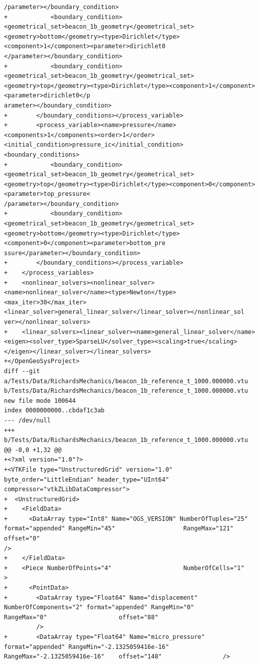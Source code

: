 \documentclass[10pt]{article}
\begin{document}
\begin{lstlisting}
/parameter></boundary_condition>
+            <boundary_condition><geometrical_set>beacon_1b_geometry</geometrical_set><geometry>bottom</geometry><type>Dirichlet</type><component>1</component><parameter>dirichlet0
</parameter></boundary_condition>
+            <boundary_condition><geometrical_set>beacon_1b_geometry</geometrical_set><geometry>top</geometry><type>Dirichlet</type><component>1</component><parameter>dirichlet0</p
arameter></boundary_condition>
+        </boundary_conditions></process_variable>
+        <process_variable><name>pressure</name><components>1</components><order>1</order><initial_condition>pressure_ic</initial_condition><boundary_conditions>
+            <boundary_condition><geometrical_set>beacon_1b_geometry</geometrical_set><geometry>top</geometry><type>Dirichlet</type><component>0</component><parameter>top_pressure<
/parameter></boundary_condition>
+            <boundary_condition><geometrical_set>beacon_1b_geometry</geometrical_set><geometry>bottom</geometry><type>Dirichlet</type><component>0</component><parameter>bottom_pre
ssure</parameter></boundary_condition>
+        </boundary_conditions></process_variable>
+    </process_variables>
+    <nonlinear_solvers><nonlinear_solver><name>nonlinear_solver</name><type>Newton</type><max_iter>30</max_iter><linear_solver>general_linear_solver</linear_solver></nonlinear_sol
ver></nonlinear_solvers>
+    <linear_solvers><linear_solver><name>general_linear_solver</name><eigen><solver_type>SparseLU</solver_type><scaling>true</scaling></eigen></linear_solver></linear_solvers>
+</OpenGeoSysProject>
diff --git a/Tests/Data/RichardsMechanics/beacon_1b_reference_t_1000.000000.vtu b/Tests/Data/RichardsMechanics/beacon_1b_reference_t_1000.000000.vtu
new file mode 100644
index 0000000000..cbdaf1c3ab
--- /dev/null
+++ b/Tests/Data/RichardsMechanics/beacon_1b_reference_t_1000.000000.vtu
@@ -0,0 +1,32 @@
+<?xml version="1.0"?>
+<VTKFile type="UnstructuredGrid" version="1.0" byte_order="LittleEndian" header_type="UInt64" compressor="vtkZLibDataCompressor">
+  <UnstructuredGrid>
+    <FieldData>
+      <DataArray type="Int8" Name="OGS_VERSION" NumberOfTuples="25" format="appended" RangeMin="45"                   RangeMax="121"                  offset="0"                   
/>
+    </FieldData>
+    <Piece NumberOfPoints="4"                    NumberOfCells="1"                   >
+      <PointData>
+        <DataArray type="Float64" Name="displacement" NumberOfComponents="2" format="appended" RangeMin="0"                    RangeMax="0"                    offset="88"         
         />
+        <DataArray type="Float64" Name="micro_pressure" format="appended" RangeMin="-2.1325059416e-16"    RangeMax="-2.1325059416e-16"    offset="148"                 />

\end{lstlisting}
\end{document}
